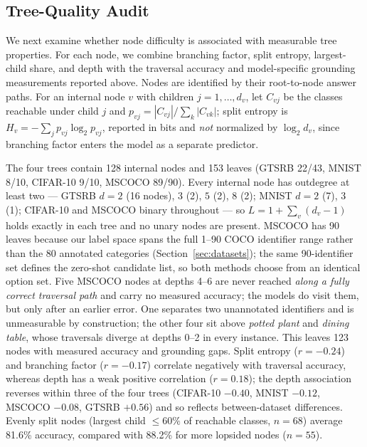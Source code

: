 \subsection{Tree-Quality Audit}
\label{sec:tree_quality_audit}
We next examine whether node difficulty is associated with measurable tree properties. For each node, we combine branching factor, split entropy, largest-child share, and depth with the traversal accuracy and model-specific grounding measurements reported above. Nodes are identified by their root-to-node answer paths. For an internal node $v$ with children $j=1,\dots,d_v$, let $C_{vj}$ be the classes reachable under child $j$ and $p_{vj}=|C_{vj}|/\sum_k |C_{vk}|$; split entropy is $H_v=-\sum_j p_{vj}\log_2 p_{vj}$, reported in bits and \emph{not} normalized by $\log_2 d_v$, since branching factor enters the model as a separate predictor.

The four trees contain 128 internal nodes and 153 leaves (GTSRB 22/43, MNIST 8/10, CIFAR-10 9/10, MSCOCO 89/90). Every internal node has outdegree at least two --- GTSRB $d{=}2$ (16 nodes), $3$ (2), $5$ (2), $8$ (2); MNIST $d{=}2$ (7), $3$ (1); CIFAR-10 and MSCOCO binary throughout --- so $L=1+\sum_v (d_v-1)$ holds exactly in each tree and no unary nodes are present. MSCOCO has 90 leaves because our label space spans the full 1--90 COCO identifier range rather than the 80 annotated categories (Section~\ref{sec:datasets}); the same 90-identifier set defines the zero-shot candidate list, so both methods choose from an identical option set. Five MSCOCO nodes at depths 4--6 are never reached \emph{along a fully correct traversal path} and carry no measured accuracy; the models do visit them, but only after an earlier error. One separates two unannotated identifiers and is unmeasurable by construction; the other four sit above \emph{potted plant} and \emph{dining table}, whose traversals diverge at depths 0--2 in every instance. This leaves 123 nodes with measured accuracy and grounding gaps. Split entropy ($r=-0.24$) and branching factor ($r=-0.17$) correlate negatively with traversal accuracy, whereas depth has a weak positive correlation ($r=0.18$); the depth association reverses within three of the four trees (CIFAR-10 $-0.40$, MNIST $-0.12$, MSCOCO $-0.08$, GTSRB $+0.56$) and so reflects between-dataset differences. Evenly split nodes (largest child $\leq60\%$ of reachable classes, $n=68$) average 81.6\% accuracy, compared with 88.2\% for more lopsided nodes ($n=55$).

